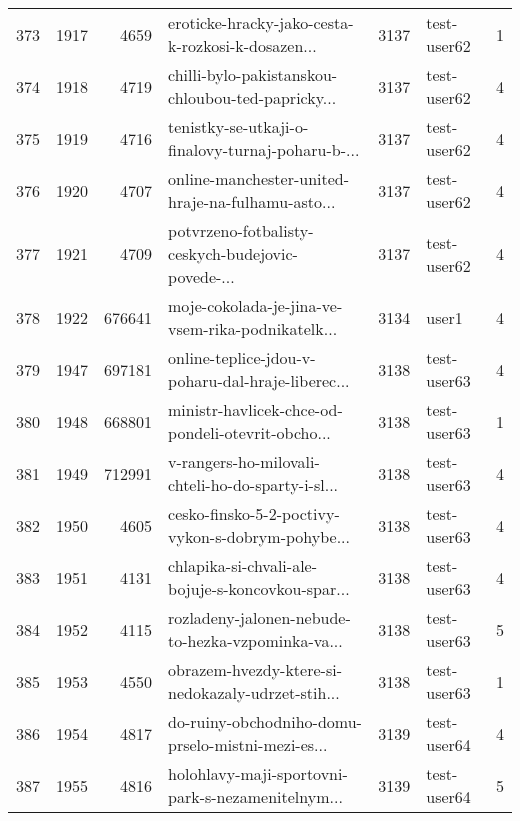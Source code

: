 \begin{tabular}{lrrlrlr}
373  &       1917 &     4659 &  eroticke-hracky-jako-cesta-k-rozkosi-k-dosazen... &     3137 &                  test-user62 &               1 \\
374  &       1918 &     4719 &  chilli-bylo-pakistanskou-chloubou-ted-papricky... &     3137 &                  test-user62 &               4 \\
375  &       1919 &     4716 &  tenistky-se-utkaji-o-finalovy-turnaj-poharu-b-... &     3137 &                  test-user62 &               4 \\
376  &       1920 &     4707 &  online-manchester-united-hraje-na-fulhamu-asto... &     3137 &                  test-user62 &               4 \\
377  &       1921 &     4709 &  potvrzeno-fotbalisty-ceskych-budejovic-povede-... &     3137 &                  test-user62 &               4 \\
378  &       1922 &   676641 &  moje-cokolada-je-jina-ve-vsem-rika-podnikatelk... &     3134 &                        user1 &               4 \\
379  &       1947 &   697181 &  online-teplice-jdou-v-poharu-dal-hraje-liberec... &     3138 &                  test-user63 &               4 \\
380  &       1948 &   668801 &  ministr-havlicek-chce-od-pondeli-otevrit-obcho... &     3138 &                  test-user63 &               1 \\
381  &       1949 &   712991 &  v-rangers-ho-milovali-chteli-ho-do-sparty-i-sl... &     3138 &                  test-user63 &               4 \\
382  &       1950 &     4605 &  cesko-finsko-5-2-poctivy-vykon-s-dobrym-pohybe... &     3138 &                  test-user63 &               4 \\
383  &       1951 &     4131 &  chlapika-si-chvali-ale-bojuje-s-koncovkou-spar... &     3138 &                  test-user63 &               4 \\
384  &       1952 &     4115 &  rozladeny-jalonen-nebude-to-hezka-vzpominka-va... &     3138 &                  test-user63 &               5 \\
385  &       1953 &     4550 &  obrazem-hvezdy-ktere-si-nedokazaly-udrzet-stih... &     3138 &                  test-user63 &               1 \\
386  &       1954 &     4817 &  do-ruiny-obchodniho-domu-prselo-mistni-mezi-es... &     3139 &                  test-user64 &               4 \\
387  &       1955 &     4816 &  holohlavy-maji-sportovni-park-s-nezamenitelnym... &     3139 &                  test-user64 &               5 \\

\end{tabular}
